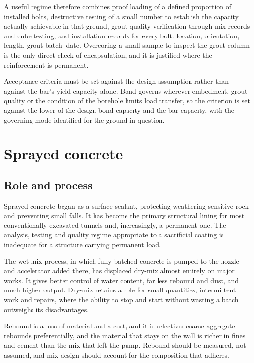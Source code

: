 A useful regime therefore combines proof loading of a defined proportion of
installed bolts, destructive testing of a small number to establish the
capacity actually achievable in that ground, grout quality verification
through mix records and cube testing, and installation records for every bolt:
location, orientation, length, grout batch, date. Overcoring a small
sample to inspect the grout column is the only direct check of encapsulation,
and it is justified where the reinforcement is permanent.

Acceptance criteria must be set against the design assumption rather than
against the bar's yield capacity alone. Bond governs wherever embedment,
grout quality or the condition of the borehole limits load transfer, so the
criterion is set against the lower of the design bond capacity and the bar
capacity, with the governing mode identified for the ground in question.

\section{Sprayed concrete}
\label{sec:sprayed-concrete}

\subsection{Role and process}
\label{sec:shotcrete-role}

Sprayed concrete began as a surface sealant, protecting weathering-sensitive
rock and preventing small falls. It has become the primary structural lining
for most conventionally excavated tunnels and, increasingly, a permanent one.
The analysis, testing and quality regime
appropriate to a sacrificial coating is inadequate for a structure carrying
permanent load.

The wet-mix process, in which fully batched concrete is pumped to the nozzle
and accelerator added there, has displaced dry-mix almost entirely on major
works. It gives better control of water content, far less rebound and dust,
and much higher output. Dry-mix retains a role for small quantities,
intermittent work and repairs, where the ability to stop and start without
wasting a batch outweighs its disadvantages.

Rebound is a loss of material and a cost, and it is selective:
coarse aggregate rebounds preferentially, and the material that stays on the
wall is richer in fines and cement than the mix that left the pump. Rebound
should be measured, not assumed, and mix design should account for the
composition that adheres.

